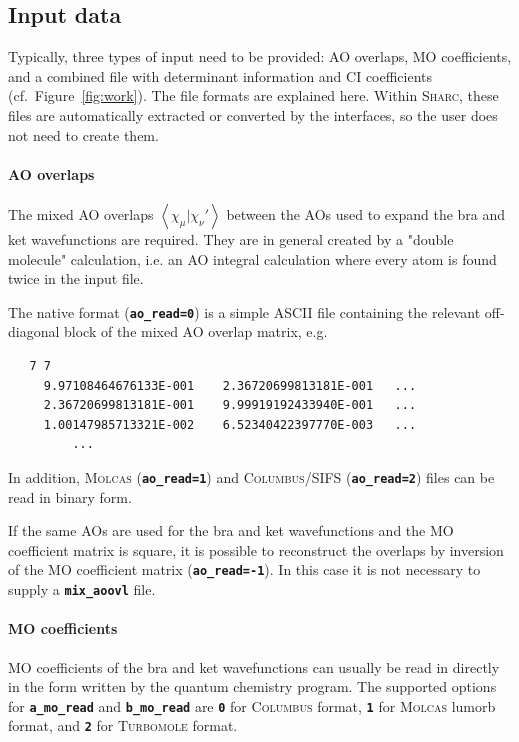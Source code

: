 \documentclass[a4paper,10pt,DIV=15,openany,twoside=false]{scrbook}
\newcommand{\sharc}{\textsc{Sharc}}
\newcommand{\ttt}[1]{\textbf{\texttt{#1}}}
\newenvironment{example}{
  \setlength{\OuterFrameSep}{3pt}
  \vspace{0mm}
  \definecolor{shadecolor}{HTML}{E4F4FF}
  \begin{shaded}
}{
  \end{shaded}
}
\begin{document}
\subsection{Input data}
Typically, three types of input need to be provided: AO overlaps, MO coefficients, and a combined file with determinant information and CI coefficients (cf.~Figure~\ref{fig:work}).
The file formats are explained here.
Within \sharc, these files are automatically extracted or converted by the interfaces, so the user does not need to create them.

\paragraph{AO overlaps}
The mixed AO overlaps $\left<\chi_{\mu}|\chi_{\nu}'\right>$ between the AOs used to expand the bra and ket wavefunctions are required.
They are in general created by a "double molecule" calculation, i.e. an AO integral calculation where every atom is found twice in the input file.

The native format (\ttt{ao\_read=0}) is a simple ASCII file containing the relevant off-diagonal block of the mixed AO overlap matrix, e.g.

\begin{example}
\begin{verbatim}
   7 7
     9.97108464676133E-001    2.36720699813181E-001   ...
     2.36720699813181E-001    9.99919192433940E-001   ...
     1.00147985713321E-002    6.52340422397770E-003   ...
         ...
\end{verbatim}
\end{example}

In addition, \textsc{Molcas} (\ttt{ao\_read=1}) and \textsc{Columbus/SIFS} (\ttt{ao\_read=2}) files can be read in binary form.

If the same AOs are used for the bra and ket wavefunctions and the MO coefficient matrix is square, it is possible to reconstruct the overlaps by inversion of the MO coefficient matrix (\ttt{ao\_read=-1}).
In this case it is not necessary to supply a \ttt{mix\_aoovl} file.

\paragraph{MO coefficients}

MO coefficients of the bra and ket wavefunctions can usually be read in directly in the form written by the quantum chemistry program.
The supported options for \ttt{a\_mo\_read} and \ttt{b\_mo\_read} are \ttt{0} for \textsc{Columbus} format, \ttt{1} for \textsc{Molcas} lumorb format, and \ttt{2} for \textsc{Turbomole} format.
\end{document}
